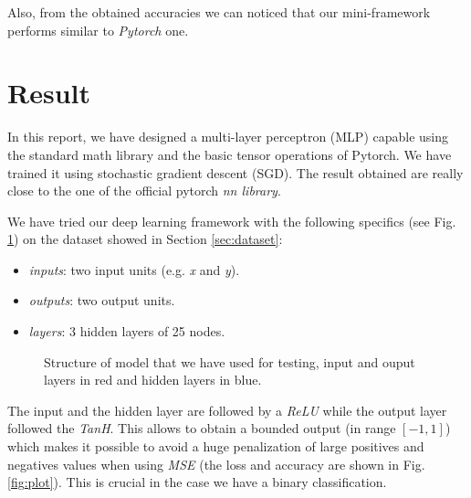 \documentclass[journal, a4paper]{IEEEtran}
\begin{document}
Also, from the obtained accuracies we can noticed that our mini-framework performs similar to \textit{Pytorch} one.



\section{Result}
In this report, we have designed a multi-layer perceptron (MLP) capable using the standard math library and the basic tensor operations of Pytorch. We have trained it using stochastic gradient descent (SGD). The result obtained are really close to the one of the official pytorch \textit{nn library}.

We have tried our deep learning framework with the following specifics (see Fig. \ref{fig:res}) on the dataset showed in Section \ref{sec:dataset}:
\begin{itemize}
    \item \textit{inputs}: two input units (e.g. \textit{x} and \textit{y}).
    \item \textit{outputs}: two output units.
    \item \textit{layers}: 3 hidden layers of 25 nodes.
\end{itemize}
\begin {figure}[h!]
\centering
{}
\caption{Structure of model that we have used for testing, input and ouput layers in red and hidden layers in blue.}
\label{fig:res}
\end{figure}
The input and the hidden layer are followed by a \textit{ReLU} while the output layer followed the \textit{TanH}. This allows to obtain a bounded output (in range $[-1, 1]$) which makes it possible to avoid a huge penalization of large positives and negatives values when using \textit{MSE} (the loss and accuracy are shown in Fig. \ref{fig:plot}). This is crucial in the case we have a binary classification.
\end{document}
